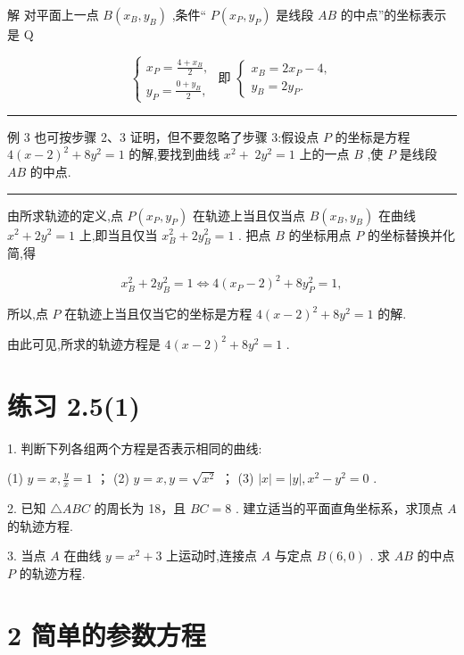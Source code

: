 \documentclass[10pt]{article}
\newcommand{\HRule}{\begin{center}\rule{0.9\linewidth}{0.2mm}\end{center}}
\begin{document}
解 对平面上一点 \(B\left( {{x}_{B},{y}_{B}}\right)\) ,条件“ \(P\left( {{x}_{P},{y}_{P}}\right)\) 是线段 \({AB}\) 的中点”的坐标表示是 Q

\[
\left\{  {\begin{array}{l} {x}_{P} = \frac{4 + {x}_{B}}{2}, \\  {y}_{P} = \frac{0 + {y}_{B}}{2}, \end{array}\text{ 即 }\left\{  \begin{array}{l} {x}_{B} = 2{x}_{P} - 4, \\  {y}_{B} = 2{y}_{P}. \end{array}\right. }\right.
\]

\HRule

例 3 也可按步骤 2、3 证明，但不要忽略了步骤 3:假设点 \(P\) 的坐标是方程 \(4{\left( x - 2\right) }^{2} + 8{y}^{2} = 1\) 的解,要找到曲线 \({x}^{2} + \; 2{y}^{2} = 1\) 上的一点 \(B\) ,使 \(P\) 是线段 \({AB}\) 的中点.

\HRule

由所求轨迹的定义,点 \(P\left( {{x}_{P},{y}_{P}}\right)\) 在轨迹上当且仅当点 \(B\left( {{x}_{B},{y}_{B}}\right)\) 在曲线 \({x}^{2} + 2{y}^{2} = 1\) 上,即当且仅当 \({x}_{B}^{2} + 2{y}_{B}^{2} = 1\) . 把点 \(B\) 的坐标用点 \(P\) 的坐标替换并化简,得

\[
{x}_{B}^{2} + 2{y}_{B}^{2} = 1 \Leftrightarrow  4{\left( {x}_{P} - 2\right) }^{2} + 8{y}_{P}^{2} = 1,
\]

所以,点 \(P\) 在轨迹上当且仅当它的坐标是方程 \(4{\left( x - 2\right) }^{2} + 8{y}^{2} = 1\) 的解.

由此可见,所求的轨迹方程是 \(4{\left( x - 2\right) }^{2} + 8{y}^{2} = 1\) .

\section*{练习 2.5(1)}

1. 判断下列各组两个方程是否表示相同的曲线:

(1) \(y = x,\frac{y}{x} = 1\) ； (2) \(y = x,y = \sqrt{{x}^{2}}\) ； (3) \(\left| x\right|  = \left| y\right| ,{x}^{2} - {y}^{2} = 0\) .

2. 已知 \(\bigtriangleup  {ABC}\) 的周长为 18，且 \({BC} = 8\) . 建立适当的平面直角坐标系，求顶点 \(A\) 的轨迹方程.

3. 当点 \(A\) 在曲线 \(y = {x}^{2} + 3\) 上运动时,连接点 \(A\) 与定点 \(B\left( {6,0}\right)\) . 求 \({AB}\) 的中点 \(P\) 的轨迹方程.

\section*{2 简单的参数方程}
\end{document}
